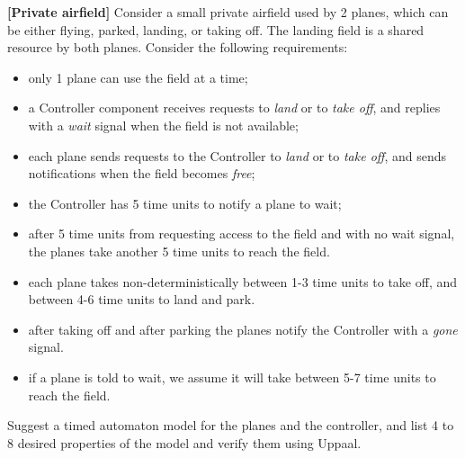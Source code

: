 \documentclass[11pt]{article}
\begin{document}
\begin{exercise} \label{ex:airfield}
\textbf{[Private airfield]}
Consider a small private airfield used by 2 planes, which can be either flying, parked, landing, or taking off. The landing field is a shared resource by both planes. Consider the following requirements:
\begin{itemize}
  \setlength\itemsep{0.3mm}
  \item only 1 plane can use the field at a time;
  \item a Controller component receives requests to \emph{land} or to \emph{take off}, and replies with a \emph{wait} signal when the field is not available;
  \item each plane sends requests to the Controller to \emph{land} or to \emph{take off}, and sends notifications when the field becomes \emph{free};
  \item the Controller has 5 time units to notify a plane to wait;
  \item after 5 time units from requesting access to the field and with no wait signal, the planes take another 5 time units to reach the field.
  \item each plane takes non-deterministically between 1-3 time units to take off, and between 4-6 time units to land and park.
  \item after taking off and after parking the planes notify the Controller with a \emph{gone} signal.
  \item if a plane is told to wait, we assume it will take between 5-7 time units to reach the field.
\end{itemize}

Suggest a timed automaton model for the planes and the controller, and list 4 to 8 desired properties of the model and verify them using Uppaal.
\end{exercise}
\end{document}
